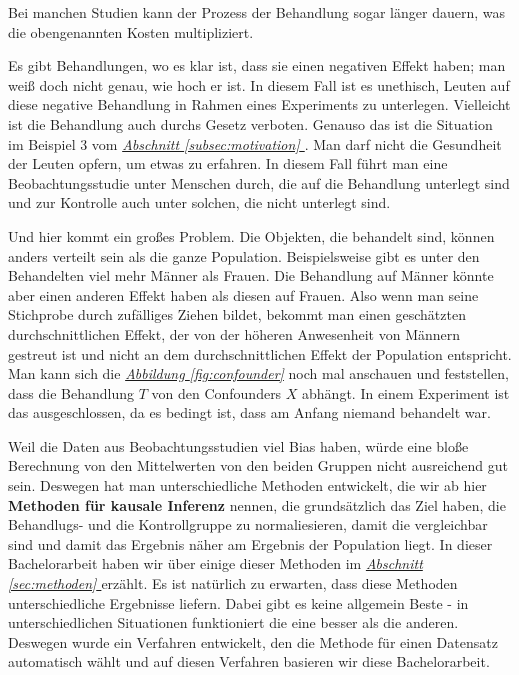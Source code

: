 \documentclass[12pt,a4paper,twoside]{scrartcl}
\numberwithin{equation}{section}
\newcommand{\reffig}[1]{\emph{\hyperref[#1]{Abbildung \ref*{#1}}}}
\newcommand{\refsec}[1]{\emph{\hyperref[#1]{Abschnitt \ref*{#1} }}}
\begin{document}
\noindent   
Bei manchen Studien kann der Prozess der Behandlung sogar länger dauern, was die obengenannten Kosten multipliziert.\par    

\noindent   
Es gibt Behandlungen, wo es klar ist, dass sie einen negativen Effekt haben; man weiß doch nicht genau, wie hoch er ist. In diesem Fall ist es unethisch, Leuten auf diese negative Behandlung in Rahmen eines Experiments zu unterlegen. Vielleicht ist die Behandlung auch durchs Gesetz verboten. Genauso das ist die Situation im Beispiel 3 vom \refsec{subsec:motivation}. Man darf nicht die Gesundheit der Leuten opfern, um etwas zu erfahren. In diesem Fall führt man eine Beobachtungsstudie unter Menschen durch, die auf die Behandlung unterlegt sind und zur Kontrolle auch unter solchen, die nicht unterlegt sind.\par

\noindent
Und hier kommt ein großes Problem. Die Objekten, die behandelt sind, können anders verteilt sein als die ganze Population. Beispielsweise gibt es unter den Behandelten viel mehr Männer als Frauen. Die Behandlung auf Männer könnte aber einen anderen Effekt haben als diesen auf Frauen. Also wenn man seine Stichprobe durch zufälliges Ziehen bildet, bekommt man einen geschätzten durchschnittlichen Effekt, der von der höheren Anwesenheit von Männern gestreut ist und nicht an dem durchschnittlichen Effekt der Population entspricht. Man kann sich die \reffig{fig:confounder} noch mal anschauen und feststellen, dass die Behandlung $T$ von den Confounders $X$ abhängt. In einem Experiment ist das ausgeschlossen, da es bedingt ist, dass am Anfang niemand behandelt war.\par


\noindent
Weil die Daten aus Beobachtungsstudien viel Bias haben, würde eine bloße Berechnung von den Mittelwerten von den beiden Gruppen nicht ausreichend gut sein. Deswegen hat man unterschiedliche Methoden entwickelt, die wir ab hier \textbf{Methoden für kausale Inferenz} nennen, die grundsätzlich das Ziel haben, die Behandlugs- und die Kontrollgruppe zu normaliesieren, damit die vergleichbar sind und damit das Ergebnis näher am Ergebnis der Population liegt. In dieser Bachelorarbeit haben wir über einige dieser Methoden im \refsec{sec:methoden} erzählt. Es ist natürlich zu erwarten, dass diese Methoden unterschiedliche Ergebnisse liefern. Dabei gibt es keine allgemein Beste - in unterschiedlichen Situationen funktioniert die eine besser als die anderen. Deswegen wurde ein Verfahren entwickelt, den die Methode für einen Datensatz automatisch wählt und auf diesen Verfahren basieren wir diese Bachelorarbeit.\par   
\end{document}
